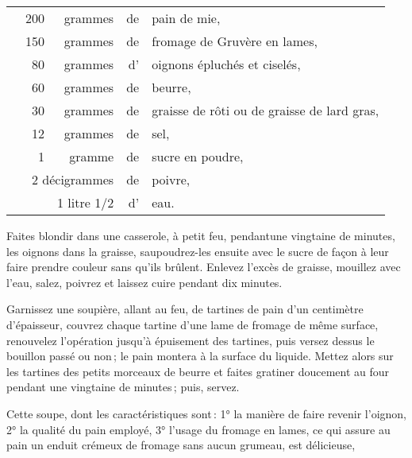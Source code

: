 \footnotesize
\begin{longtable}{rrrrp{16em}}   
  & 200 & grammes     & de & pain de mie,                                                                 \\
  & 150 & grammes     & de & fromage de Gruvère en lames,                                                 \\
  &  80 & grammes     & d' & oignons épluchés et ciselés,                                                 \\
  &  60 & grammes     & de & beurre,                                                                      \\
  &  30 & grammes     & de & graisse de rôti ou de graisse de lard gras,                                  \\
  &  12 & grammes     & de & sel,                                                                         \\
  &   1 & gramme      & de & sucre en poudre,                                                             \\
  & \multicolumn{2}{r}{2 décigrammes} & de & poivre,                                                      \\
  &     & 1 litre 1/2 & d' & eau.                                                                         \\
\end{longtable}
\normalsize
               
Faites blondir dans une casserole, à petit feu, pendantune vingtaine de
minutes, les oignons dans la graisse, saupoudrez-les ensuite avec le sucre de
façon à leur faire prendre couleur sans qu'ils brûlent. Enlevez l'excès de
graisse, mouillez avec l'eau, salez, poivrez et laissez cuire pendant dix
minutes.

Garnissez une soupière, allant au feu, de tartines de pain d'un centimètre
d'épaisseur, couvrez chaque tartine d'une lame de fromage de même surface,
renouvelez l'opération jusqu'à épuisement des tartines, puis versez dessus le
bouillon passé ou non ; le pain montera à la surface du liquide. Mettez alors
sur les tartines des petits morceaux de beurre et faites gratiner doucement au
four pendant une vingtaine de minutes ; puis, servez.

Cette soupe, dont les caractéristiques sont : 1° la manière de faire revenir
l'oignon, 2° la qualité du pain employé, 3° l'usage du fromage en lames, ce
qui assure au pain un enduit crémeux de fromage sans aucun grumeau, est
délicieuse,


